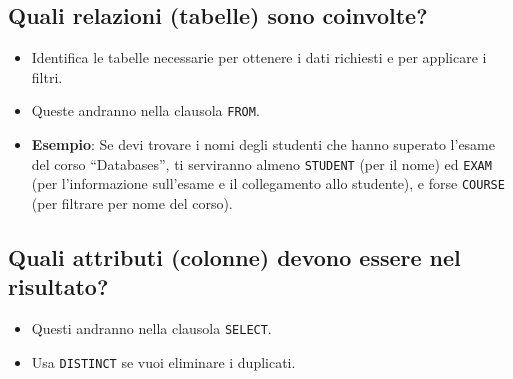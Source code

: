 \subsection{Quali relazioni (tabelle) sono coinvolte?}
\begin{itemize}
    \item Identifica le tabelle necessarie per ottenere i dati richiesti e per applicare i filtri.
    \item Queste andranno nella clausola \texttt{FROM}.
    \item \textbf{Esempio}: Se devi trovare i nomi degli studenti che hanno superato l'esame del corso ``Databases'', ti serviranno almeno \texttt{STUDENT} (per il nome) ed \texttt{EXAM} (per l'informazione sull'esame e il collegamento allo studente), e forse \texttt{COURSE} (per filtrare per nome del corso).
\end{itemize}

\subsection{Quali attributi (colonne) devono essere nel risultato?}
\begin{itemize}
    \item Questi andranno nella clausola \texttt{SELECT}.
    \item Usa \texttt{DISTINCT} se vuoi eliminare i duplicati.
\end{itemize}

